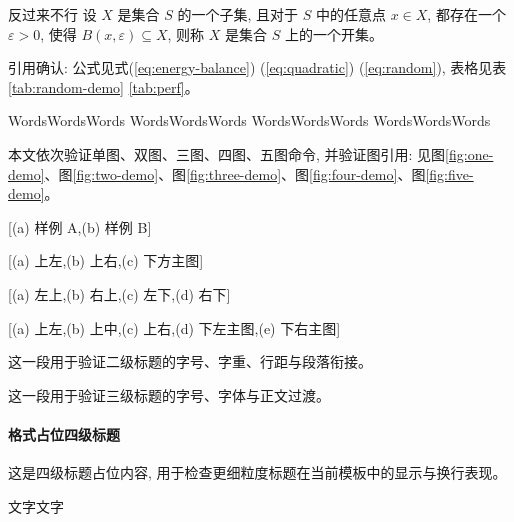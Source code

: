 \documentclass[twocolumn]{tem}
\begin{document}
反过来不行
设 $X$ 是集合 $S$ 的一个子集, 且对于 $S$ 中的任意点 $x\in X$, 都存在一个 $\varepsilon > 0$, 使得 $B(x,\varepsilon) \subseteq X$, 则称 $X$ 是集合 $S$ 上的一个开集。

引用确认: 公式见式(\ref{eq:energy-balance}) (\ref{eq:quadratic}) (\ref{eq:random}), 表格见表\ref{tab:random-demo} \ref{tab:perf}。

WordsWordsWords
WordsWordsWords
WordsWordsWords
WordsWordsWords
\zhlipsum[4]

\zhlipsum[5]

本文依次验证单图、双图、三图、四图、五图命令, 并验证图引用: 见图\ref{fig:one-demo}、图\ref{fig:two-demo}、图\ref{fig:three-demo}、图\ref{fig:four-demo}、图\ref{fig:five-demo}。

\zhlipsum[6]

[(a) 样例 A,(b) 样例 B]
\zhlipsum[7]

[(a) 上左,(b) 上右,(c) 下方主图]
\zhlipsum[8]

[(a) 左上,(b) 右上,(c) 左下,(d) 右下]
\zhlipsum[9]

[(a) 上左,(b) 上中,(c) 上右,(d) 下左主图,(e) 下右主图]
\zhlipsum[10]

这一段用于验证二级标题的字号、字重、行距与段落衔接。

这一段用于验证三级标题的字号、字体与正文过渡。

\paragraph{格式占位四级标题}
这是四级标题占位内容, 用于检查更细粒度标题在当前模板中的显示与换行表现。

文字\cite{knuth1984}文字\cite{lamport1986}
\end{document}
